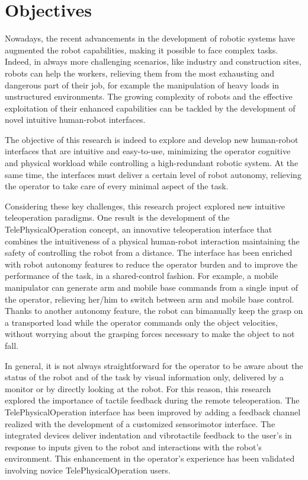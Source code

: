 \section{Objectives}

Nowadays, the recent advancements in the development of robotic systems have augmented the robot capabilities, making it possible to face complex tasks. Indeed, in always more challenging scenarios, like industry and construction sites, robots can help the workers, relieving them from the most exhausting and dangerous part of their job, for example the manipulation of heavy loads in unstructured environments. 
The growing complexity of robots and the effective exploitation of their enhanced capabilities can be tackled by the development of novel intuitive human-robot interfaces. 

The objective of this research is indeed to explore and develop new human-robot interfaces that are intuitive and easy-to-use, minimizing the operator cognitive and physical workload while controlling a high-redundant robotic system. At the same time, the interfaces must deliver a certain level of robot autonomy, relieving the operator to take care of every minimal aspect of the task. 

Considering these key challenges, this research project explored new intuitive teleoperation paradigms.
One result is the development of the TelePhysicalOperation concept, an innovative teleoperation interface that combines the intuitiveness of a physical human-robot interaction maintaining the safety of controlling the robot from a distance.
The interface has been enriched with robot autonomy features to reduce the operator burden and to improve the performance of the task, in a shared-control fashion. For example, a mobile manipulator can generate arm and mobile base commands from a single input of the operator, relieving her/him to switch between arm and mobile base control. Thanks to another autonomy feature, the robot can bimanually keep the grasp on a transported load while the operator commands only the object velocities, without worrying about the grasping forces necessary to make the object to not fall. 

In general, it is not always straightforward for the operator to be aware about the status of the robot and of the task by visual information only, delivered by a monitor or by directly looking at the robot. For this reason, this research explored the importance of tactile feedback during the remote teleoperation. The TelePhysicalOperation interface has been improved by adding a feedback channel realized with the development of a customized sensorimotor interface. The integrated devices deliver indentation and vibrotactile feedback to the user's in response to inputs given to the robot and interactions with the robot's environment. This enhancement in the operator's experience has been validated involving novice TelePhysicalOperation users.

